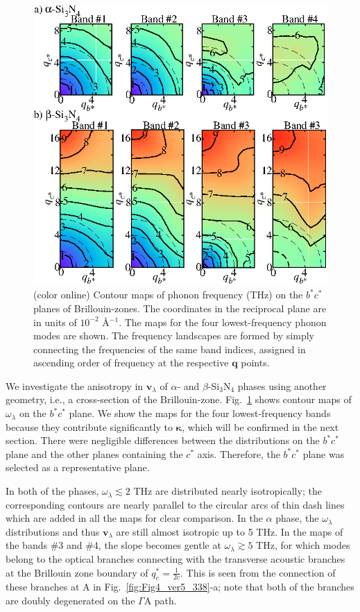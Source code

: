 \documentclass[twocolumn,amsmath,amssymb,a4paper,prb,superscriptaddress,floatfix]{revtex4-1}
\begin{document}
\begin{figure}[ht]
 \centerins
  \includegraphics[width=\linewidth]{Fig2_small.eps} \caption{(color
  online) Contour maps of phonon frequency (THz) on the $b^*c^*$
  planes of Brillouin-zones. The coordinates in the reciprocal plane 
   are in units of $10^{-2}$ \AA$^{-1}$. The maps for the four lowest-frequency
  phonon modes are shown. The frequency landscapes are formed by simply
  connecting the frequencies of the same band indices, assigned in
  ascending order of frequency at the respective $\mathbf {q}$
  points. \label{fig:Fig3_338} }
 \centering
\end{figure}

We investigate the anisotropy in $\mathbf{v}_{\lambda}$ of $\alpha$- and
$\beta$-Si$_3$N$_4$ phases using another geometry, i.e., a cross-section of the
Brillouin-zone. Fig.~\ref{fig:Fig3_338} shows contour maps of
$\omega_{\lambda}$  on the $b^*c^*$ plane.  We show the maps for the four
lowest-frequency bands because they contribute significantly to
$\boldsymbol{\kappa}$, which will be confirmed in the next section. There were
negligible differences between the distributions on the $b^*c^*$ plane and the
other planes containing the $c^*$ axis.  Therefore, the $b^*c^*$ plane was
selected as a representative plane.  

In both of the phases, $\omega_{\lambda} \lesssim 2$ THz are distributed nearly
isotropically; the corresponding contours are nearly parallel to the circular
arcs of thin dash lines which are added in all the maps for clear comparison.
In the $\alpha$ phase, the $\omega_{\lambda}$ distributions and thus
$\mathbf{v}_{\lambda}$ are still almost isotropic up to 5 THz. In the maps of
the bands \#3 and \#4, the slope becomes gentle at $\omega_\lambda \gtrsim 5$
THz, for which modes belong to the optical branches connecting with the
transverse acoustic branches at the Brillouin zone boundary of $q_c^* =
\frac{1}{2c}$. This is seen from the connection of these branches at A in
Fig.~\ref{fig:Fig4_ver5_338}-a; note that both of the branches are doubly
degenerated on the $\Gamma$A path.
\end{document}
